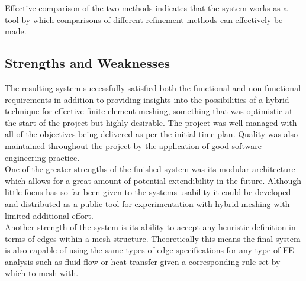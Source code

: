 \noindent
Effective comparison of the two methods indicates that the system works as a tool by which comparisons of different refinement methods can effectively be made. 

%



\subsection{Strengths and Weaknesses}
The resulting system successfully satisfied both the functional and non functional requirements in addition to providing insights into the possibilities of a hybrid technique for effective finite element meshing, something that was optimistic at the start of the project but highly desirable. The project was well managed with all of the objectives being delivered as per the initial time plan. Quality was also maintained throughout the project by the application of good software engineering practice. \\

\noindent
One of the greater strengths of the finished system was its modular architecture which allows for a great amount of potential extendibility in the future. Although little focus has so far been given to the systems usability it could be developed and distributed as a public tool for experimentation with hybrid meshing with limited additional effort. \\

\noindent
Another strength of the system is its ability to accept any heuristic definition in terms of edges within a mesh structure. Theoretically this means the final system is also capable of using the same types of edge specifications for any type of FE analysis such as fluid flow or heat transfer given a corresponding rule set by which to mesh with. \\


